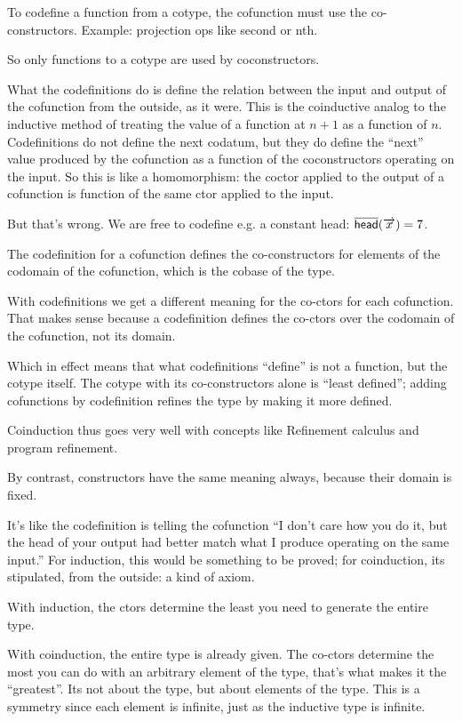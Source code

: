 \documentclass{article}
\begin{document}
To codefine a function from a cotype, the cofunction must use the
co-constructors. Example: projection ops like \textsf{second} or
\textsf{nth}.

So only functions to a cotype are used by coconstructors.

What the codefinitions do is define the relation between the input and
output of the cofunction from the outside, as it were. This is the
coinductive analog to the inductive method of treating the value of a
function at \(n+1\) as a function of \(n\). Codefinitions do not
define the next codatum, but they do define the ``next'' value
produced by the cofunction as a function of the coconstructors
operating on the input. So this is like a homomorphism: the coctor
applied to the output of a cofunction is function of the same ctor
applied to the input.

But that's wrong. We are free to codefine e.g. a constant head:
\mbox{\(\overline{\textsf{head}}(\overrightarrow{x}) = 7\)}.

The codefinition for a cofunction defines the co-constructors for
elements of the codomain of the cofunction, which is the cobase of the
type.

With codefinitions we get a different meaning for the co-ctors for
each cofunction. That makes sense because a codefinition defines the
co-ctors over the codomain of the cofunction, not its domain.

Which in effect means that what codefinitions ``define'' is not a
function, but the cotype itself. The cotype with its co-constructors
alone is ``least defined''; adding cofunctions by codefinition refines
the type by making it more defined.

Coinduction thus goes very well with concepts like Refinement calculus
and program refinement.

By contrast, constructors have the same meaning always, because their
domain is fixed.

It's like the codefinition is telling the cofunction ``I don't care
how you do it, but the head of your output had better match what I
produce operating on the same input.'' For induction, this would be
something to be proved; for coinduction, its stipulated, from the
outside: a kind of axiom.

With induction, the ctors determine the least you need to generate the
entire type.

With coinduction, the entire type is already given. The co-ctors
determine the most you can do with an arbitrary element of the type,
that's what makes it the ``greatest''. Its not about the type, but
about elements of the type. This is a symmetry since each element is
infinite, just as the inductive type is infinite.
\end{document}
